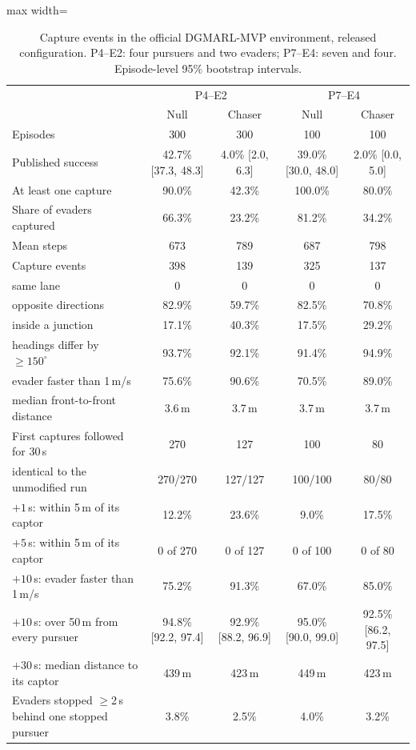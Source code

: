 \documentclass[preprint,12pt]{elsarticle}
\begin{document}
\begin{table}[!h]
\centering
\caption{Capture events in the official DGMARL-MVP environment, released configuration. P4--E2: four pursuers and two
evaders; P7--E4: seven and four. Episode-level 95\% bootstrap intervals.}
\label{tab:s-published}
\small
\setlength{\tabcolsep}{5pt}
\begin{adjustbox}{max width=\textwidth}
\begin{tabular}{@{}lcccc@{}}
\toprule
& \multicolumn{2}{c}{P4--E2} & \multicolumn{2}{c}{P7--E4} \\
& Null & Chaser & Null & Chaser \\
\midrule
Episodes & 300 & 300 & 100 & 100 \\
Published success & 42.7\% [37.3, 48.3] & 4.0\% [2.0, 6.3] & 39.0\% [30.0, 48.0] & 2.0\% [0.0, 5.0] \\
At least one capture & 90.0\% & 42.3\% & 100.0\% & 80.0\% \\
Share of evaders captured & 66.3\% & 23.2\% & 81.2\% & 34.2\% \\
Mean steps & 673 & 789 & 687 & 798 \\
Capture events & 398 & 139 & 325 & 137 \\
\quad same lane & 0 & 0 & 0 & 0 \\
\quad opposite directions & 82.9\% & 59.7\% & 82.5\% & 70.8\% \\
\quad inside a junction & 17.1\% & 40.3\% & 17.5\% & 29.2\% \\
\quad headings differ by $\ge150^\circ$ & 93.7\% & 92.1\% & 91.4\% & 94.9\% \\
\quad evader faster than 1\,m/s & 75.6\% & 90.6\% & 70.5\% & 89.0\% \\
\quad median front-to-front distance & 3.6\,m & 3.7\,m & 3.7\,m & 3.7\,m \\
\midrule
First captures followed for 30\,s & 270 & 127 & 100 & 80 \\
\quad identical to the unmodified run & 270/270 & 127/127 & 100/100 & 80/80 \\
\quad $+1$\,s: within 5\,m of its captor & 12.2\% & 23.6\% & 9.0\% & 17.5\% \\
\quad $+5$\,s: within 5\,m of its captor & 0 of 270 & 0 of 127 & 0 of 100 & 0 of 80 \\
\quad $+10$\,s: evader faster than 1\,m/s & 75.2\% & 91.3\% & 67.0\% & 85.0\% \\
\quad $+10$\,s: over 50\,m from every pursuer & 94.8\% [92.2, 97.4] & 92.9\% [88.2, 96.9] & 95.0\% [90.0, 99.0] & 92.5\% [86.2, 97.5] \\
\quad $+30$\,s: median distance to its captor & 439\,m & 423\,m & 449\,m & 423\,m \\
\midrule
Evaders stopped $\ge$2\,s behind one stopped pursuer & 3.8\% & 2.5\% & 4.0\% & 3.2\% \\
\bottomrule
\end{tabular}
\end{adjustbox}
\end{table}
\end{document}
